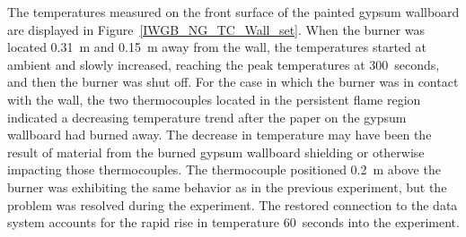 \documentclass[twoside]{uocthesis}
\begin{document}
{The temperatures measured on the front surface of the painted gypsum wallboard are displayed in Figure~\ref{IWGB_NG_TC_Wall_set}.  When the burner was located 0.31~m and 0.15~m away from the wall, the temperatures started at ambient and slowly increased, reaching the peak temperatures at 300~seconds, and then the burner was shut off.  For the case in which the burner was in contact with the wall, the two thermocouples located in the persistent flame region indicated a decreasing temperature trend after the paper on the gypsum wallboard had burned away.  The decrease in temperature may have been the result of material from the burned gypsum wallboard shielding or otherwise impacting those thermocouples. The thermocouple positioned 0.2~m above the burner was exhibiting the same behavior as in the previous experiment, but the problem was resolved during the experiment.  The restored connection to the data system accounts for the rapid rise in temperature 60~seconds into the experiment.  

}
\end{document}
